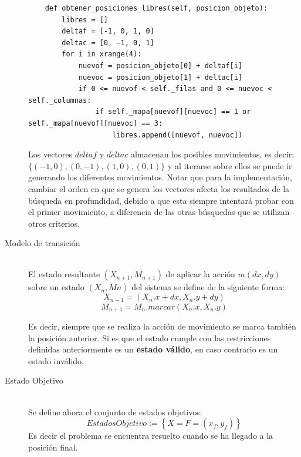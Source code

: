 \documentclass[letter, titlepage, 10pt]{article}
\begin{document}
\begin{description}
  \begin{lstlisting}
    def obtener_posiciones_libres(self, posicion_objeto):
        libres = []
        deltaf = [-1, 0, 1, 0]
        deltac = [0, -1, 0, 1]
        for i in xrange(4):
            nuevof = posicion_objeto[0] + deltaf[i]
            nuevoc = posicion_objeto[1] + deltac[i]
            if 0 <= nuevof < self._filas and 0 <= nuevoc < self._columnas:
                if self._mapa[nuevof][nuevoc] == 1 or self._mapa[nuevof][nuevoc] == 3:
                    libres.append([nuevof, nuevoc])

  \end{lstlisting}
  
Los vectores $deltaf$ y $deltac$ almacenan los posibles movimientos, es decir: $\{(-1, 0), (0, -1), (1, 0), (0, 1)\}$ y al iterarse sobre ellos se puede ir generando los diferentes movimientos. Notar que para la implementación, cambiar el orden en que se genera los vectores afecta los resultados de la búsqueda en profundidad, debido a que esta siempre intentará probar con el primer movimiento, a diferencia de las otras búsquedas que se utilizan otros criterios.

    \newpage  
    \item[Modelo de transición] \hfill \\
    El estado resultante $(X_{n+1},M_{n+1})$ de aplicar la acción $m(dx,dy)$ sobre un estado $(X_{n},M{n})$ del sistema se define de la siguiente forma:
    \begin{displaymath}
      X_{n+1} = (X_{n}.x + dx, X_{n}.y + dy)
    \end{displaymath}
    \begin{displaymath}
      M_{n+1} = M_{n}.marcar(X_{n}.x, X_{n}.y) 
    \end{displaymath}

    Es decir, siempre que se realiza la acción de movimiento se marca también la posición anterior. Si es que el estado cumple con las restricciones definidas anteriormente es un \textbf{estado válido}, en caso contrario es un estado inválido.
   
    \item[Estado Objetivo] \hfill \\
Se define ahora el conjunto de estados objetivos:
    \begin{displaymath}
      EstadosObjetivo := \left\lbrace X = F = (x_f, y_f) \right\rbrace
    \end{displaymath}
Es decir el problema se encuentra resuelto cuando se ha llegado a la posición final.


\end{description}
\end{document}
